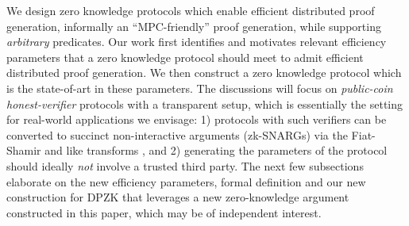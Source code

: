 We design zero knowledge protocols which enable efficient distributed proof generation, informally an ``MPC-friendly'' proof generation, while supporting \textit{arbitrary} predicates. %
Our work first identifies and motivates relevant efficiency parameters that a
zero knowledge protocol should meet to admit efficient distributed proof generation. 
We then construct a zero knowledge 
protocol which is the state-of-art in these parameters. The discussions will
focus on {\em public-coin honest-verifier} protocols with a transparent setup,
which is essentially the setting for real-world applications we envisage: 1) protocols with
such verifiers can be converted to succinct non-interactive  arguments
(zk-SNARGs)  via the Fiat-Shamir and like transforms \cite{FS86, BCS16}, and  2)
generating the parameters of the protocol should ideally {\em not} involve a
trusted third party. The next few subsections elaborate on the new efficiency
parameters, formal definition and our new construction for DPZK that leverages 
a new zero-knowledge argument constructed in this paper, which may be of
independent interest. 

